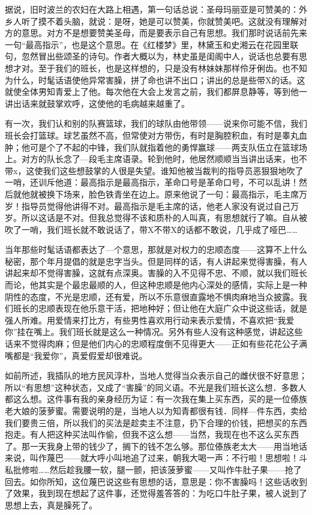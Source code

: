 据说，旧时波兰的农妇在大路上相遇，第一句话总说：圣母玛丽亚是可赞美的：外乡人听了摸不着头脑，就说：是呀，她是可以赞美，你就赞美吧。这就没有理解对方的意思。对方不是想要赞美圣母，而是要表示自己有思想。我们那时说话前先来一句“最高指示”，也是这个意思。在《红楼梦》里，林黛玉和史湘云在花园里联句，忽然冒出些颂圣的诗句。作者大概以为，林史虽是闺阁中人，说话也总要有思想才对。至于我们的班长，也是这样想的，只是没有林妹妹那样伶牙俐齿。也不知为什么，时髦话语使他异常害臊，拼了命也讲不出口；讲出的总是些带X的话。这就使全体男知青爱上了他。每次他在大会上发言之前，我们都屏息静等，等到他一讲出话来就鼓掌欢呼，这使他的毛病越来越重了。 

有一次，我们认和别的队赛篮球，我们的球队由他带领——说来你可能不信，我们班长会打篮球。球艺虽然不高，但常使对方带伤，有时是胸腔积血，有时是睾丸血肿；他可是个了不起的中锋，我们队就指着他的勇悍赢球——两支队伍立在篮球场上。对方的队长念了—段毛主席语录。轮到他时，他居然顺顺当当讲出话来，也不带x，这使我们这些想鼓掌的人很是失望。谁知他被当裁判的指导员恶狠狠地吹了一哨，还训斥他道：最高指示是最高指示，革命口号是革命口号，不可以乱讲！然后就他就被换下场来，脸色铁青坐在边上。原来他说了一句：最高指示，毛主席万岁！指导员觉得他讲得不对。最高指示是毛主席的话，他老人家没有说过自己万岁。所以这话是不对。但我总觉得不该和质朴的人叫真，有思想就行了嘛。自从被吹了一哨，我们班长就不敢说话了，带X不带X的话都不敢说，几乎成了哑巴…… 

当年那些时髦话语都表达了—个意思，那就是对权力的忠顺态度——这算不上什么秘密，那个年月提倡的就是忠字当头。但是同样的话，有人讲起来觉得害臊，有人讲起来却不觉得害臊，这就有点深奥。害臊的入不见得不忠、不顺，就以我们班长而论，他其实是个最忠最顺的人，但这种忠顺是他内心深处的感情，实际上是一种阴性的态度，不光是忠顺，还有爱，所以不乐意很直露地不惧肉麻地当众披露。我们班长的忠顺表现在他乐意干活，把地种好；但让他在大庭广众中说这些话，就是强人所难。用爱情来打比方，有些男性喜欢用行动来表示爱情，不喜欢把“我爱你”挂在嘴上。我们班长就是这么一种情况。另外有些人没有这种感觉，讲起这些话来不觉得肉麻；但是他们内心的忠顺程度倒不见得更大——正如有些花花公子满嘴都是“我爱你”，真爱假爱却很难说。 

如前所述，我插队的地方民风淳朴，当地人觉得当众表示自己的雌伏很不好意思；所以“有思想”这种状态，又成了“害臊”的同义语。不光是我们班长这么想．多数人都这么想。这件事有我的亲身经历为证：有一次我在集上买东西，买的是一位傣族老大娘的菠萝蜜。需要说明的是，当地人以为知青都很有钱．同样—件东西，卖给我们要贵三倍，所以我们的买法是趁卖主不注意，扔下合理的价钱，把想买的东西抱走。有人把这种买法叫作偷，但我不这么想——当然，我现在也不这么买东西了。那一天我身上带的钱少了，搁下的钱不怎么够。那位傣族老太大——用当地话来说，叫作蔑巴——就大呼小叫地追了过来，朝我大喝一声：不行啦！思想啦！斗私批修啦……然后趁我腰一软，腿一颤，把该菠萝蜜——又叫作牛肚子果——抢了回去。如你所知，这位蔑巴说这些有思想的话，意思是：你不害臊吗！这些话收到了效果，我到现在想起了这件事，还觉得羞答答的：为吃口牛肚子果，被人说到了思想上去，真是臊死了。

